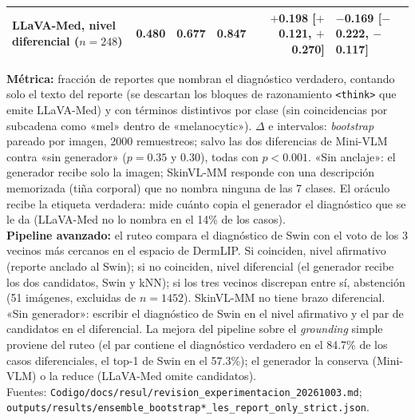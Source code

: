 \begin{table}[htbp]
{\begin{tabular}{@{}lrrrrrl@{}}
\rowcolor{thiswork}
LLaVA-Med, nivel diferencial ($n{=}248$) & 0.480 & \textbf{0.677} & 0.847 & \multicolumn{2}{r}{$+$0.198 [$+$0.121, $+$0.270]} & $-$0.169 [$-$0.222, $-$0.117] \\
\bottomrule
\end{tabular}%
}
\vspace{4pt}
\begin{minipage}{\textwidth}
  \footnotesize
  \textbf{Métrica:} fracción de reportes que nombran el diagnóstico verdadero, contando solo el texto del
  reporte (se descartan los bloques de razonamiento \texttt{<think>} que emite LLaVA-Med) y con términos
  distintivos por clase (sin coincidencias por subcadena como «mel» dentro de «melanocytic»). $\Delta$ e
  intervalos: \textit{bootstrap} pareado por imagen, 2000 remuestreos; salvo las dos diferencias de Mini-VLM
  contra «sin generador» ($p{=}0.35$ y $0.30$), todas con $p<0.001$. «Sin anclaje»: el generador recibe
  solo la imagen; SkinVL-MM responde con una descripción memorizada (tiña corporal) que no nombra ninguna de
  las 7 clases. El oráculo recibe la etiqueta verdadera: mide cuánto copia el generador el diagnóstico que
  se le da (LLaVA-Med no lo nombra en el 14\% de los casos).\\[4pt]
  \textbf{Pipeline avanzado:} el ruteo compara el diagnóstico de Swin con el voto de los 3 vecinos más
  cercanos en el espacio de DermLIP. Si coinciden, nivel afirmativo (reporte anclado al Swin); si no
  coinciden, nivel diferencial (el generador recibe los dos candidatos, Swin y kNN); si los tres vecinos
  discrepan entre sí, abstención (51 imágenes, excluidas de $n{=}1452$). SkinVL-MM no tiene brazo
  diferencial. «Sin generador»: escribir el diagnóstico de Swin en el nivel afirmativo y el par de
  candidatos en el diferencial. La mejora del pipeline sobre el \textit{grounding} simple proviene del
  ruteo (el par contiene el diagnóstico verdadero en el 84.7\% de los casos diferenciales, el top-1 de Swin
  en el 57.3\%); el generador la conserva (Mini-VLM) o la reduce (LLaVA-Med omite candidatos).\\[4pt]
  Fuentes: \texttt{Codigo/docs/resul/revision\_experimentacion\_20261003.md};
  \texttt{outputs/results/ensemble\_bootstrap*\_les\_report\_only\_strict.json}.
\end{minipage}
\end{table}


